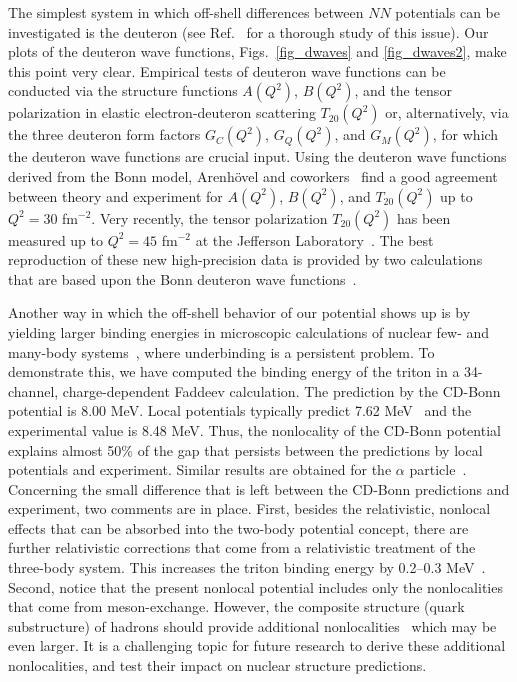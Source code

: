 The simplest system in which off-shell differences between $NN$
potentials can be investigated is the deuteron
(see Ref.~\cite{Pol98} for a thorough study of this issue).
Our plots of the deuteron wave functions,
Figs.~\ref{fig_dwaves} and \ref{fig_dwaves2},
make this point very clear.
Empirical tests of deuteron wave functions can be conducted via
the structure functions
$A(Q^2)$, $B(Q^2)$,
and the tensor polarization in elastic electron-deuteron
scattering 
$T_{20}(Q^2)$ 
or, alternatively, via the three deuteron
form factors
$G_C(Q^2)$, $G_Q(Q^2)$, and $G_M(Q^2)$,
for which the deuteron wave functions are crucial input.
Using the deuteron wave functions derived from the Bonn model,
Arenh\"ovel and coworkers~\cite{ARW00} find a good agreement
between theory and experiment for
$A(Q^2)$, $B(Q^2)$, and $T_{20}(Q^2)$ 
up to $Q^2 = 30$ fm$^{-2}$.
Very recently, the tensor polarization
$T_{20}(Q^2)$ 
has been measured up to
$Q^2 = 45$ fm$^{-2}$
at the Jefferson Laboratory~\cite{Abb00}.
The best reproduction of these new high-precision data
is provided by two calculations that are based upon the
Bonn deuteron wave functions~\cite{PWD99,CK99}.

Another way in which
the off-shell behavior of our potential shows up 
is by yielding larger binding
energies in microscopic calculations of nuclear few- and many-body 
systems~\cite{Eng97}, where underbinding is a persistent problem.
To demonstrate this, we have computed the binding energy of the triton
in a 34-channel, charge-dependent Faddeev calculation. 
The prediction by the CD-Bonn potential is 8.00 MeV.
Local potentials typically predict 7.62 MeV~\cite{Fri93,NKG00}
and the experimental value is 8.48 MeV.
Thus, the nonlocality of the CD-Bonn potential
explains almost 50\% of the gap that persists between the predictions
by local potentials and experiment.
Similar results are obtained for the $\alpha$ particle~\cite{NKG00,NKB00}.
Concerning the small difference that is left between the 
CD-Bonn predictions and experiment,
two comments are in place. First, 
besides the relativistic, nonlocal effects that can be absorbed
into the two-body potential concept, 
there are further relativistic corrections
that come from a relativistic treatment of the three-body system. 
This increases
the triton binding energy by 0.2--0.3 MeV~\cite{SXM92,RT92,SM98,MSS96}.
Second, notice
that the present nonlocal potential includes only the
nonlocalities that come from meson-exchange. 
However, the composite structure (quark substructure) of hadrons
should provide additional nonlocalities~\cite{VS95} which may be even larger.
It is a challenging topic for future research to derive 
these additional nonlocalities, and test their impact on 
nuclear structure predictions.

